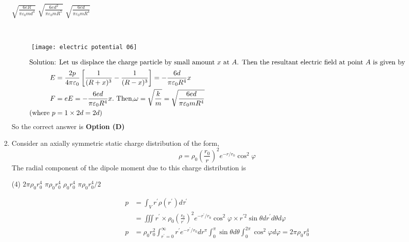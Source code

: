 \begin{enumerate}
\begin{tasks}
		\task[\textbf{B.}] $\sqrt{\frac{6 e R}{\pi \varepsilon_{0} m d^{4}}}$
		\task[\textbf{C.}]  $\sqrt{\frac{6 e d^{2}}{\pi \varepsilon_{0} m R^{5}}}$
		\task[\textbf{D.}] $\sqrt{\frac{6 e d}{\pi \varepsilon_{0} m R^{4}}}$
	\end{tasks}
	\begin{answer}$\left. \right. $
		\begin{figure}[H]
			\centering
			\texttt{[image: electric potential 06]}
		\end{figure}
		\begin{align*}
		\intertext{Solution: Let us displace the charge particle by small amount $x$ at $A$. Then the resultant electric field at point $A$ is given by}
		E&=\frac{2 p}{4 \pi \varepsilon_{0}}\left[\frac{1}{(R+x)^{3}}-\frac{1}{(R-x)^{3}}\right]=-\frac{6 d}{\pi \varepsilon_{0} R^{4}} x\\
		F&=e E=-\frac{6 e d}{\pi \varepsilon_{0} R^{4}} x .\text{ Then,} \omega=\sqrt{\frac{k}{m}}=\sqrt{\frac{6 e d}{\pi \varepsilon_{0} m R^{4}}}\\
		(\text{where }p&=1 \times 2 d=2 d )
		\end{align*}
		So the correct answer is \textbf{Option (D)}
	\end{answer}
	\item Consider an axially symmetric static charge distribution of the form,
	$$
	\rho=\rho_{0}\left(\frac{r_{0}}{r}\right)^{2} e^{-r / r_{0}} \cos ^{2} \varphi
	$$
	The radial component of the dipole moment due to this charge distribution is
	{}
	\begin{tasks}(4)
		\task[\textbf{A.}] $2 \pi \rho_{0} r_{0}^{4}$
		\task[\textbf{B.}] $\pi \rho_{0} r_{0}^{4}$
		\task[\textbf{C.}] $\rho_{0} r_{0}^{4}$
		\task[\textbf{D.}] $\pi \rho_{0} r_{0}^{4} / 2$
	\end{tasks}
	\begin{answer}
		\begin{align*}
		p&=\int_{V} r^{\prime} \rho\left(r^{\prime}\right) d \tau^{\prime}\\&=\iiint r^{\prime} \times \rho_{0}\left(\frac{r_{0}}{r^{\prime}}\right)^{2} e^{-r^{\prime} / r_{0}} \cos ^{2} \varphi \times r^{\prime 2} \sin \theta d r^{\prime} d \theta d \varphi\\
		p&=\rho_{0} r_{0}^{2} \int_{r^{\prime}=0}^{\infty} r^{\prime} e^{-r^{\prime} / r_{0}} d r^{\pi} \int_{0}^{\pi} \sin \theta d \theta \int_{0}^{2 \pi} \cos ^{2} \varphi d \varphi=2 \pi \rho_{0} r_{0}^{4}
		\end{align*}

\end{answer}
\end{enumerate}
